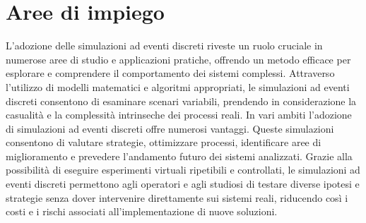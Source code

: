 \documentclass[12pt,a4paper,openright,twoside]{book}
\begin{document}
\section{Aree di impiego}
L'adozione delle simulazioni ad eventi discreti riveste un ruolo cruciale in numerose aree di studio e applicazioni pratiche, offrendo un metodo efficace per esplorare e comprendere il comportamento dei sistemi complessi. Attraverso l'utilizzo di modelli matematici e algoritmi appropriati, le simulazioni ad eventi discreti consentono di esaminare scenari variabili, prendendo in considerazione la casualità e la complessità intrinseche dei processi reali.
In vari ambiti l'adozione di simulazioni ad eventi discreti offre numerosi vantaggi. Queste simulazioni consentono di valutare strategie, ottimizzare processi, identificare aree di miglioramento e prevedere l'andamento futuro dei sistemi analizzati. Grazie alla possibilità di eseguire esperimenti virtuali ripetibili e controllati, le simulazioni ad eventi discreti permettono agli operatori e agli studiosi di testare diverse ipotesi e strategie senza dover intervenire direttamente sui sistemi reali, riducendo così i costi e i rischi associati all'implementazione di nuove soluzioni.
\end{document}
